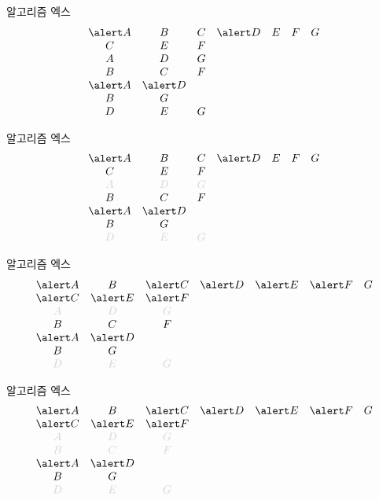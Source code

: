\documentclass[xcolor=svgnames]{beamer}
\let\a\alert
\def\g{\color{LightGray}}
\begin{document}
%
\begin{frame}{알고리즘 엑스}
\Large\boldmath
  $$
  \begin{array}{ccccccc}
    \a A & B & C & \a D & E & F & G\\
    C & E & F &&&&\\
    A & D & G &&&&\\
    B & C & F &&&&\\
    \a A & \a D &&&&&\\
    B & G &&&&&\\
    D & E & G &&&&
  \end{array}
  $$
\end{frame}

%
\begin{frame}{알고리즘 엑스}
\Large\boldmath
  $$
  \begin{array}{ccccccc}
    \a A & B & C & \a D & E & F & G\\
    C & E & F &&&&\\
    \g A & \g D & \g G &&&&\\
    B & C & F &&&&\\
    \a A & \a D &&&&&\\
    B & G &&&&&\\
    \g D & \g E & \g G &&&&
  \end{array}
  $$
\end{frame}

%
\begin{frame}{알고리즘 엑스}
\Large\boldmath
  $$
  \begin{array}{ccccccc}
    \a A & B & \a C & \a D & \a E & \a F & G\\
    \a C & \a E & \a F &&&&\\
    \g A & \g D & \g G &&&&\\
    B & C & F &&&&\\
    \a A & \a D &&&&&\\
    B & G &&&&&\\
    \g D & \g E & \g G &&&&
  \end{array}
  $$
\end{frame}

%
\begin{frame}{알고리즘 엑스}
\Large\boldmath
  $$
  \begin{array}{ccccccc}
    \a A & B & \a C & \a D & \a E & \a F & G\\
    \a C & \a E & \a F &&&&\\
    \g A & \g D & \g G &&&&\\
    \g B & \g C & \g F &&&&\\
    \a A & \a D &&&&&\\
    B & G &&&&&\\
    \g D & \g E & \g G &&&&
  \end{array}
  $$
\end{frame}
\end{document}
